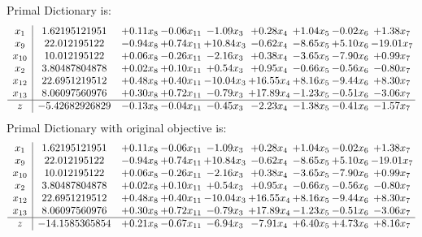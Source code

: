 \documentclass[9pt]{article}
\begin{document}
Primal Dictionary is:
\[\begin{array}{c| c c@{\hskip 2pt} c@{\hskip 2pt} c@{\hskip 2pt} c@{\hskip 2pt} c@{\hskip 2pt} c@{\hskip 2pt} c@{\hskip 2pt} }
 x_{1}   &  1.62195121951 & +  0.11 x_{8} & -0.06 x_{11} & -1.09 x_{3} & +  0.28 x_{4} & +  1.04 x_{5} & -0.02 x_{6} & +  1.38 x_{7}\\
 x_{9}   &  22.012195122 & -0.94 x_{8} & +  0.74 x_{11} & + 10.84 x_{3} & -0.62 x_{4} & -8.65 x_{5} & +  5.10 x_{6} & -19.01 x_{7}\\
 x_{10}   &  10.012195122 & +  0.06 x_{8} & -0.26 x_{11} & -2.16 x_{3} & +  0.38 x_{4} & -3.65 x_{5} & -7.90 x_{6} & +  0.99 x_{7}\\
 x_{2}   &  3.80487804878 & +  0.02 x_{8} & +  0.10 x_{11} & +  0.54 x_{3} & +  0.95 x_{4} & -0.66 x_{5} & -0.56 x_{6} & -0.80 x_{7}\\
 x_{12}   &  22.6951219512 & +  0.48 x_{8} & +  0.40 x_{11} & -10.04 x_{3} & + 16.55 x_{4} & +  8.16 x_{5} & -9.44 x_{6} & +  8.30 x_{7}\\
 x_{13}   &  8.06097560976 & +  0.30 x_{8} & +  0.72 x_{11} & -0.79 x_{3} & + 17.89 x_{4} & -1.23 x_{5} & -0.51 x_{6} & -3.06 x_{7}\\
\hline
z    &  -5.42682926829 & -0.13 x_{8} & -0.04 x_{11} & -0.45 x_{3} & -2.23 x_{4} & -1.38 x_{5} & -0.41 x_{6} & -1.57 x_{7}\\
\end{array}\]
Primal Dictionary with original objective is:
\[\begin{array}{c| c c@{\hskip 2pt} c@{\hskip 2pt} c@{\hskip 2pt} c@{\hskip 2pt} c@{\hskip 2pt} c@{\hskip 2pt} c@{\hskip 2pt} }
 x_{1}   &  1.62195121951 & +  0.11 x_{8} & -0.06 x_{11} & -1.09 x_{3} & +  0.28 x_{4} & +  1.04 x_{5} & -0.02 x_{6} & +  1.38 x_{7}\\
 x_{9}   &  22.012195122 & -0.94 x_{8} & +  0.74 x_{11} & + 10.84 x_{3} & -0.62 x_{4} & -8.65 x_{5} & +  5.10 x_{6} & -19.01 x_{7}\\
 x_{10}   &  10.012195122 & +  0.06 x_{8} & -0.26 x_{11} & -2.16 x_{3} & +  0.38 x_{4} & -3.65 x_{5} & -7.90 x_{6} & +  0.99 x_{7}\\
 x_{2}   &  3.80487804878 & +  0.02 x_{8} & +  0.10 x_{11} & +  0.54 x_{3} & +  0.95 x_{4} & -0.66 x_{5} & -0.56 x_{6} & -0.80 x_{7}\\
 x_{12}   &  22.6951219512 & +  0.48 x_{8} & +  0.40 x_{11} & -10.04 x_{3} & + 16.55 x_{4} & +  8.16 x_{5} & -9.44 x_{6} & +  8.30 x_{7}\\
 x_{13}   &  8.06097560976 & +  0.30 x_{8} & +  0.72 x_{11} & -0.79 x_{3} & + 17.89 x_{4} & -1.23 x_{5} & -0.51 x_{6} & -3.06 x_{7}\\
\hline
z    &  -14.1585365854 & +  0.21 x_{8} & -0.67 x_{11} & -6.94 x_{3} & -7.91 x_{4} & +  6.40 x_{5} & +  4.73 x_{6} & +  8.16 x_{7}\\
\end{array}\]
\end{document}
